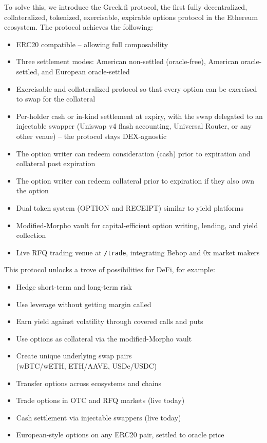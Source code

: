 \documentclass[%
 reprint,
 amsmath,amssymb,
 aps,
 prl,
floatfix,
]{revtex4-2}
\newcommand{\greekfi}{Greek.fi }
\begin{document}
To solve this, we introduce the \greekfi protocol,
the first fully decentralized, collateralized, tokenized,
exercisable, expirable options protocol in the Ethereum ecosystem.
The protocol achieves the following:
\begin{itemize}
  \setlength{\itemsep}{0pt}
  \setlength{\parskip}{0pt}
  \item ERC20 compatible -- allowing full composability
  \item Three settlement modes: American non-settled (oracle-free),
    American oracle-settled, and European oracle-settled
  \item Exercisable and collateralized protocol so that every option can be
    exercised to swap for the collateral
  \item Per-holder cash or in-kind settlement at expiry, with the swap delegated
    to an injectable swapper (Uniswap v4 flash accounting, Universal Router, or any
    other venue) -- the protocol stays DEX-agnostic
  \item The option writer can redeem consideration (cash) prior to expiration
    and collateral post expiration
  \item The option writer can redeem collateral prior to expiration if they also
    own the option
  \item Dual token system (OPTION and RECEIPT) similar to yield platforms
  \item Modified-Morpho vault for capital-efficient option writing, lending, and
    yield collection
  \item Live RFQ trading venue at \texttt{/trade}, integrating Bebop and 0x market makers
\end{itemize}

This protocol unlocks a trove of possibilities for DeFi, for example:

\begin{itemize}
  \setlength{\itemsep}{0pt}
  \setlength{\parskip}{0pt}
  \item Hedge short-term and long-term risk
  \item Use leverage without getting margin called
  \item Earn yield against volatility through covered calls and puts
  \item Use options as collateral via the modified-Morpho vault
  \item Create unique underlying swap pairs \\ (wBTC/wETH, ETH/AAVE, USDe/USDC)
  \item Transfer options across ecosystems and chains
  \item Trade options in OTC and RFQ markets (live today)
  \item Cash settlement via injectable swappers (live today)
  \item European-style options on any ERC20 pair, settled to oracle price
\end{itemize}
\end{document}
